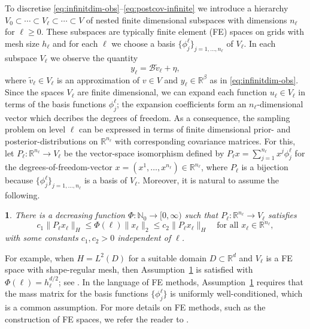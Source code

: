 \documentclass[11pt,english]{article}
\theoremstyle{plain}
\theoremstyle{plain}
\newtheorem{assumption}{\protect\assumptionname}
\theoremstyle{plain}
\theoremstyle{plain}
\numberwithin{equation}{section}
\newcommand{\rev}[1]{#1}
\newcommand{\jg}[1]{#1}
\providecommand{\assumptionname}{Assumption}
\begin{document}
To discretise \eqref{eq:infinitdim-obs}--\eqref{eq:postcov-infinite} we introduce a hierarchy $V_{0}\subset\dotsb\subset V_{\ell}\subset\dotsb\subset V$ of nested finite dimensional subspaces with dimensions $n_{\ell}$ for $\ell \ge 0$. 
These subspaces are typically finite element \rev{(FE) spaces on grids with mesh size $h_\ell$} and for each $\ell$ we choose a basis $\{\phi_{j}^{\ell}\}_{j=1,\dots,n_{\ell}}$ of $V_{\ell}$. In each subspace $V_{\ell}$ we observe the quantity
\begin{equation}
	y_{\ell}=\mathcal{B}\tilde{v}_{\ell}+\eta,\label{eq:finitedim-obs}
\end{equation}
where $\tilde{v}_{\ell}\in V_{\ell}$ is an approximation of $v\in V$ and $y_{\ell} \in\mathbb{R}^\beta$ as in \eqref{eq:infinitdim-obs}.
Since the spaces $V_{\ell}$ are finite dimensional, we can expand each function $u_\ell \in V_\ell$ in terms of the basis functions $\phi_{j}^{\ell}$; the expansion coefficients form an $n_\ell$-dimensional vector which decribes the degrees of freedom. As a consequence, the sampling problem on level $\ell$ can be expressed in terms of finite dimensional prior- and posterior-distributions on $\mathbb{R}^{n_{\ell}}$ with corresponding covariance matrices. For this, let $P_{\ell}\colon\mathbb{R}^{n_{\ell}}\to V_{\ell}$ be the vector-space isomorphism defined by $P_{\ell}x=\sum_{j=1}^{n_{\ell}}x^{j}\phi_{j}^{\ell}$ for the degrees-of-freedom-vector $x=(x^{1},\dots,x^{n_{\ell}})\in\mathbb{R}^{n_\ell}$, where $P_{\ell}$ is
a bijection because $\{\phi_{j}^{\ell}\}_{j=1,\dots,n_{\ell}}$ is a basis of $V_\ell$. Moreover, it is natural to assume the following.
\begin{assumption}
	\label{assu:Pell}There is a decreasing function
        $\Phi\colon\mathbb{N}_{0}\to[0,\infty)$ such that %
        $P_{\ell}\colon\mathbb{R}^{n_{\ell}}\to V_{\ell}$ satisfies
	\begin{equation}
		c_{1}\|P_{\ell}x_{\ell}\|_{H}\leq\Phi(\ell)\|x_{\ell}\|_{2}\leq c_{2}\|P_{\ell}x_{\ell}\|_{H}\quad\text{for all }x_{\ell}\in\mathbb{R}^{n_{\ell}},\label{eq:Pl-property}
	\end{equation}
	with some constants $c_1,c_2>0$ independent of $\ell$.
\end{assumption}
For example, when $H=L^{2}(D)$ for a suitable domain $D\subset\mathbb{R}^{d}$ and $V_{\ell}$ is a FE space with shape-regular mesh, then Assumption~\ref{assu:Pell} is satisfied with $\Phi(\ell)=h_{\ell}^{d/2}$; see \cite[Theorem 8.76]{Hackbusch.W_2017_book_elliptic_2nd}. 
\jg{In the language of FE methods, Assumption~\ref{assu:Pell} requires that  the mass matrix for the basis functions $\{\phi_j^{\ell}\}$ is uniformly well-conditioned, which is a common assumption. 
	For more details on FE methods, such as the construction of FE spaces, we refer the reader to \cite{Ciarlet.P2002book}.}
\end{document}
